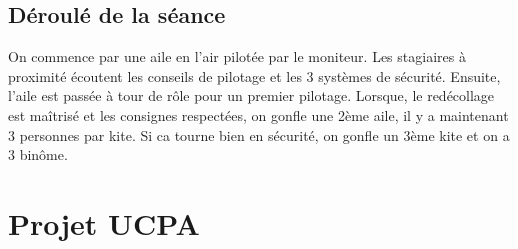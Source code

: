 \documentclass[11pt,a4paper]{report}
\begin{document}
\section{Déroulé de la séance}
On commence par une aile en l'air pilotée par le moniteur.
Les stagiaires à proximité écoutent les conseils de pilotage et les 3 systèmes
de sécurité.
Ensuite, l'aile est passée à tour de rôle pour un premier pilotage.
Lorsque, le redécollage est maîtrisé et les consignes respectées, 
on gonfle une 2ème aile, il y a maintenant 3 personnes par kite.
Si ca tourne bien en sécurité, on gonfle un 3ème kite et on a 3 binôme.


\chapter{Projet UCPA\label{ucpa_projet}}




\end{document}
